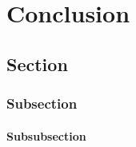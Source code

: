 \chapter{Conclusion}

\section{Section}
\subsection{Subsection}
\subsubsection{Subsubsection}
\lipsum[6-10]